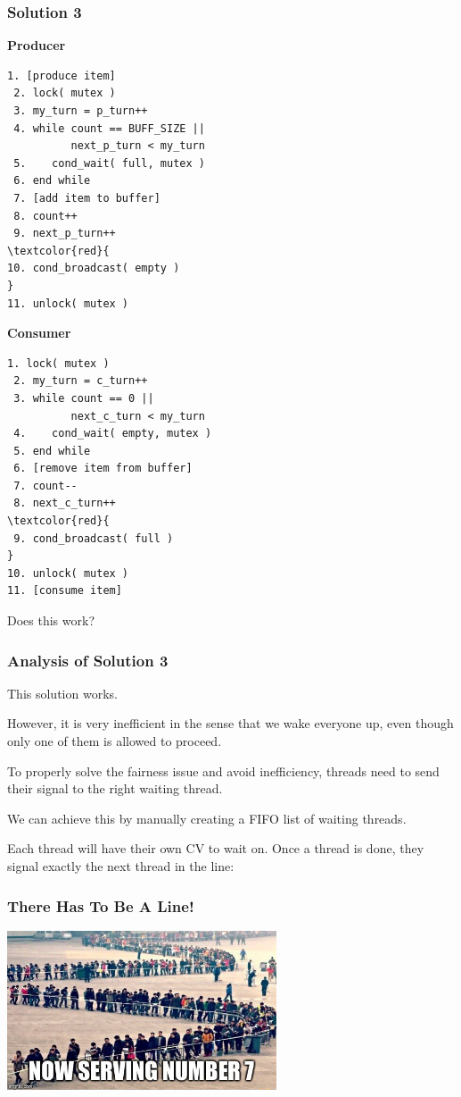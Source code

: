 \begin{frame}[fragile]
	\frametitle{Solution 3}

	\begin{multicols}{2}
		\small
		\textbf{Producer}
		\begin{Verbatim}[commandchars=\\\{\}]
 1. [produce item]
 2. lock( mutex )
 3. my_turn = p_turn++
 4. while count == BUFF_SIZE ||
          next_p_turn < my_turn
 5.    cond_wait( full, mutex )
 6. end while
 7. [add item to buffer]
 8. count++
 9. next_p_turn++
\textcolor{red}{
10. cond_broadcast( empty )
}
11. unlock( mutex )
		\end{Verbatim}
		\columnbreak
		\textbf{Consumer}\vspace{-2em}
		\begin{Verbatim}[commandchars=\\\{\}]
 1. lock( mutex )
 2. my_turn = c_turn++
 3. while count == 0 ||
          next_c_turn < my_turn
 4.    cond_wait( empty, mutex )
 5. end while
 6. [remove item from buffer]
 7. count--
 8. next_c_turn++
\textcolor{red}{
 9. cond_broadcast( full )
}
10. unlock( mutex )
11. [consume item]
		\end{Verbatim}
	\end{multicols}
	\vspace{-2em}

	Does this work?

\end{frame}

\begin{frame}
	\frametitle{Analysis of Solution 3}
	This solution works.

	However, it is very \alert{inefficient} in the sense that we wake everyone up, even though only one of them is allowed to proceed.

	To properly solve the fairness issue and avoid inefficiency, threads need to send their signal to the \alert{right} waiting thread.

	We can achieve this by manually creating a FIFO list of waiting threads.

	Each thread will have their own CV to wait on.
	Once a thread is done, they signal exactly the next thread in the line:
\end{frame}

\begin{frame}
	\frametitle{There Has To Be A Line!}

	\begin{center}
		\includegraphics[width=0.6\textwidth]{images/now_serving2}
	\end{center}
\end{frame}

